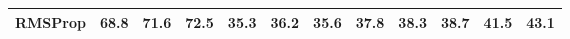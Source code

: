 \begin{table}[H]
{\begin{tabular}{l|ccc|cccccccc}
\cellcolor[HTML]{DBCEE4}RMSProp   & 68.8                          & 71.6                          & 72.5                                         & 35.3                           & 36.2                                    & 35.6                          & 37.8                          & 38.3                          & 38.7                            & 41.5                                         & 43.1                                         \\
% 
    \bottomrule
    \end{tabular}
    }
    \label{tab:coco_det_pose}
\end{table}

